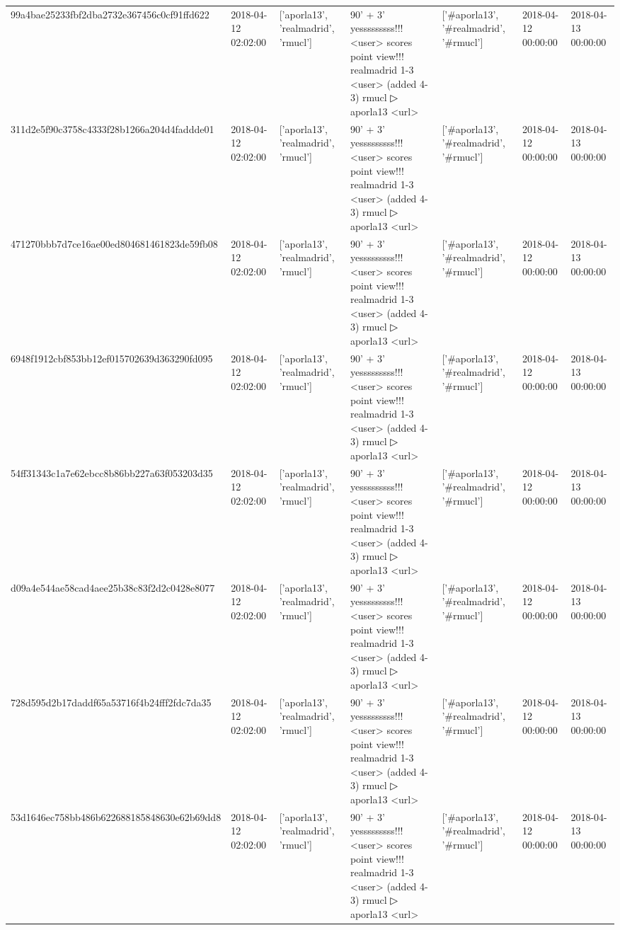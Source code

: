 \begin{tabular}{lllllll}
99a4bae25233fbf2dba2732e367456c0cf91ffd622 & 2018-04-12 02:02:00 & ['aporla13', 'realmadrid', 'rmucl'] & 90' + 3' yesssssssss!!! <user> scores point view!!! realmadrid 1-3 <user> (added 4-3) rmucl ▷ aporla13 <url> & ['#aporla13', '#realmadrid', '#rmucl'] & 2018-04-12 00:00:00 & 2018-04-13 00:00:00 \\
311d2e5f90c3758c4333f28b1266a204d4faddde01 & 2018-04-12 02:02:00 & ['aporla13', 'realmadrid', 'rmucl'] & 90' + 3' yesssssssss!!! <user> scores point view!!! realmadrid 1-3 <user> (added 4-3) rmucl ▷ aporla13 <url> & ['#aporla13', '#realmadrid', '#rmucl'] & 2018-04-12 00:00:00 & 2018-04-13 00:00:00 \\
471270bbb7d7ce16ae00ed804681461823de59fb08 & 2018-04-12 02:02:00 & ['aporla13', 'realmadrid', 'rmucl'] & 90' + 3' yesssssssss!!! <user> scores point view!!! realmadrid 1-3 <user> (added 4-3) rmucl ▷ aporla13 <url> & ['#aporla13', '#realmadrid', '#rmucl'] & 2018-04-12 00:00:00 & 2018-04-13 00:00:00 \\
6948f1912cbf853bb12ef015702639d363290fd095 & 2018-04-12 02:02:00 & ['aporla13', 'realmadrid', 'rmucl'] & 90' + 3' yesssssssss!!! <user> scores point view!!! realmadrid 1-3 <user> (added 4-3) rmucl ▷ aporla13 <url> & ['#aporla13', '#realmadrid', '#rmucl'] & 2018-04-12 00:00:00 & 2018-04-13 00:00:00 \\
54ff31343c1a7e62ebcc8b86bb227a63f053203d35 & 2018-04-12 02:02:00 & ['aporla13', 'realmadrid', 'rmucl'] & 90' + 3' yesssssssss!!! <user> scores point view!!! realmadrid 1-3 <user> (added 4-3) rmucl ▷ aporla13 <url> & ['#aporla13', '#realmadrid', '#rmucl'] & 2018-04-12 00:00:00 & 2018-04-13 00:00:00 \\
d09a4e544ae58cad4aee25b38c83f2d2c0428e8077 & 2018-04-12 02:02:00 & ['aporla13', 'realmadrid', 'rmucl'] & 90' + 3' yesssssssss!!! <user> scores point view!!! realmadrid 1-3 <user> (added 4-3) rmucl ▷ aporla13 <url> & ['#aporla13', '#realmadrid', '#rmucl'] & 2018-04-12 00:00:00 & 2018-04-13 00:00:00 \\
728d595d2b17daddf65a53716f4b24fff2fdc7da35 & 2018-04-12 02:02:00 & ['aporla13', 'realmadrid', 'rmucl'] & 90' + 3' yesssssssss!!! <user> scores point view!!! realmadrid 1-3 <user> (added 4-3) rmucl ▷ aporla13 <url> & ['#aporla13', '#realmadrid', '#rmucl'] & 2018-04-12 00:00:00 & 2018-04-13 00:00:00 \\
53d1646ec758bb486b622688185848630e62b69dd8 & 2018-04-12 02:02:00 & ['aporla13', 'realmadrid', 'rmucl'] & 90' + 3' yesssssssss!!! <user> scores point view!!! realmadrid 1-3 <user> (added 4-3) rmucl ▷ aporla13 <url> & ['#aporla13', '#realmadrid', '#rmucl'] & 2018-04-12 00:00:00 & 2018-04-13 00:00:00 \\

\end{tabular}
